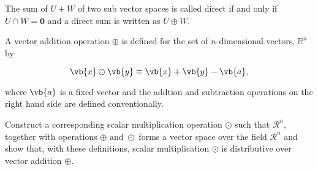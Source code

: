 \documentclass[a4paper,12pt]{report}
\begin{document}
The sum of \(U+W\) of two sub vector spaces is called direct if and only if \(U \cap W = {\boldsymbol{0} }\) and a direct sum is written as \(U \oplus W\).   

{A vector addition operation \(\oplus\) is defined for the set of \(n\)-dimensional vectors, \(\mathbb{R}^{n} \) by 

\begin{equation}
    \vb{x}  \oplus \vb{y}  \equiv \vb{x} + \vb{y} -\vb{a},
\end{equation}

where \(\vb{a} \) is a fixed vector and the addtion and subtraction operations on the right hand side are defined conventionally. 

Construct a corresponding scalar multiplication operation \(\odot\) such that \(\mathcal{R}^{n} \), together with operations \(\oplus \text { and } \odot\) forms a vector space over the field \(\mathcal{R}^{n} \)    and show that, with these definitions, scalar multiplication \(\odot\) is distributive over vector addition \(\oplus\).   
}
\end{document}
